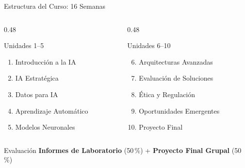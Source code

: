 \documentclass[aspectratio=169]{beamer}
\begin{document}
\begin{frame}{Estructura del Curso: 16 Semanas}
  \small
  \begin{columns}[T]
    \begin{column}{0.48\textwidth}
      \begin{block}{\faBookOpen\enspace Unidades 1--5}
        \begin{enumerate}\setlength\itemsep{2pt}
          \item Introducción a la IA
          \item IA Estratégica
          \item Datos para IA
          \item Aprendizaje Automático
          \item Modelos Neuronales
        \end{enumerate}
      \end{block}
    \end{column}
    \begin{column}{0.48\textwidth}
      \begin{block}{\faCogs\enspace Unidades 6--10}
        \begin{enumerate}\setcounter{enumi}{5}\setlength\itemsep{2pt}
          \item Arquitecturas Avanzadas
          \item Evaluación de Soluciones
          \item Ética y Regulación
          \item Oportunidades Emergentes
          \item Proyecto Final
        \end{enumerate}
      \end{block}
    \end{column}
  \end{columns}
  \vspace{0.3cm}
  \begin{alertblock}{\faBalanceScale\enspace Evaluación}
    \centering\small
    \textbf{Informes de Laboratorio} (50\,\%) \quad+\quad
    \textbf{Proyecto Final Grupal} (50\,\%)
  \end{alertblock}
\end{frame}
\end{document}
